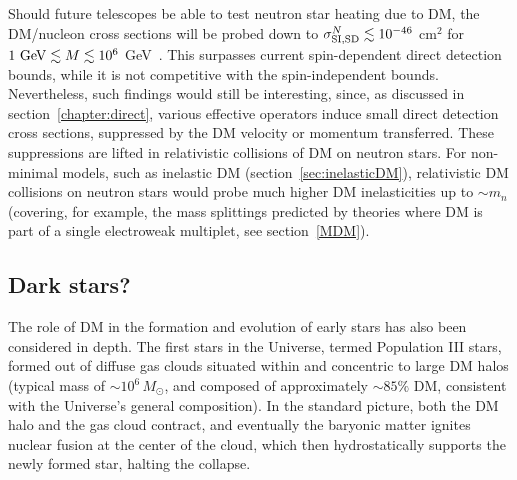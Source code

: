 Should future telescopes be able to test neutron star heating due to DM, 
the DM/nucleon cross sections will be probed down to
$\sigma_{\rm SI, SD}^N \lesssim 10^{-46}$ cm$^2$ for $1 \ {\rm GeV} \lesssim M \lesssim 10^6$ GeV~\cite{DMcaptureinNSandannihil,DMkineticheatingNS}.
This surpasses current spin-dependent direct detection bounds, while it is not competitive with the spin-independent bounds.
Nevertheless, such findings would still be interesting, since, as discussed in section~\ref{chapter:direct},
various effective operators induce small direct detection cross sections, suppressed 
by the DM velocity or momentum transferred.
These suppressions are lifted in relativistic collisions of DM on neutron stars.
For non-minimal models, such as inelastic DM (section~\ref{sec:inelasticDM}),
relativistic DM collisions on neutron stars would probe much higher DM inelasticities up to $\sim m_n$
(covering, for example, the mass splittings predicted by theories where DM is part of a single electroweak multiplet, see section~\ref{MDM}).



\subsection{Dark stars?}\label{sec:DarkStars}
The role of DM in the formation and evolution of early stars has also been considered in depth. 
The first stars in the Universe, termed Population III stars, formed out of diffuse gas clouds situated within and concentric to large DM halos (typical mass of $\sim 10^6 \, M_\odot$, 
and composed of approximately $\sim85\%$ DM, consistent with the Universe's general composition). 
In the standard picture, 
both the DM halo and the gas cloud contract, and eventually the baryonic matter ignites nuclear fusion at the center of the cloud, which then hydrostatically supports the newly formed star, halting the collapse. 

